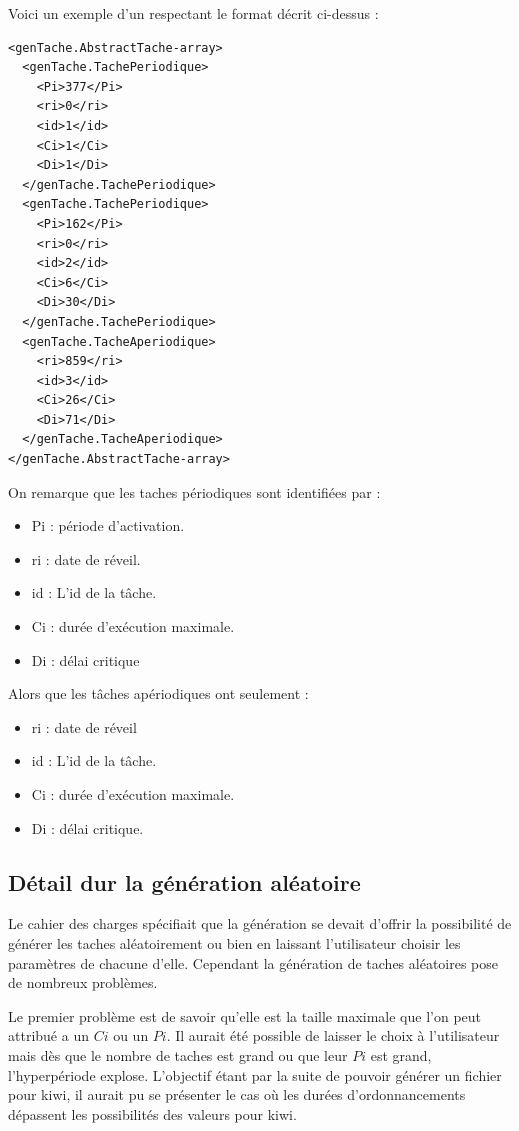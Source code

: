 Voici un exemple d'un respectant le format décrit ci-dessus : 

\begin{lstlisting}
<genTache.AbstractTache-array>
  <genTache.TachePeriodique>
    <Pi>377</Pi>
    <ri>0</ri>
    <id>1</id>
    <Ci>1</Ci>
    <Di>1</Di>
  </genTache.TachePeriodique>
  <genTache.TachePeriodique>
    <Pi>162</Pi>
    <ri>0</ri>
    <id>2</id>
    <Ci>6</Ci>
    <Di>30</Di>
  </genTache.TachePeriodique>
  <genTache.TacheAperiodique>
    <ri>859</ri>
    <id>3</id>
    <Ci>26</Ci>
    <Di>71</Di>
  </genTache.TacheAperiodique>
</genTache.AbstractTache-array>
\end{lstlisting}
On remarque que les taches périodiques sont identifiées par : 
\begin{itemize}
\item
Pi : période d'activation.
\item
ri : date de réveil.
\item
id : L'id de la tâche.
\item
Ci : durée d'exécution maximale.
\item
Di  : délai critique
\end{itemize} 
Alors que les tâches apériodiques ont seulement : 
\begin{itemize}
\item
ri  : date de réveil
\item
id : L'id de la tâche.
\item
Ci : durée d'exécution maximale.
\item
Di : délai critique.
\end{itemize} 
\subsection{Détail dur la génération aléatoire}
Le cahier des charges spécifiait que la génération se devait d'offrir la possibilité de générer les taches aléatoirement ou bien en laissant l'utilisateur choisir les paramètres de chacune d'elle. Cependant la génération de taches aléatoires pose de nombreux problèmes.

Le premier problème est de savoir qu'elle est la taille maximale que l'on peut attribué a un $Ci$ ou un $Pi$. Il aurait été possible de laisser le choix à l'utilisateur mais dès que le nombre de taches est grand ou que leur $Pi$ est grand, l'hyperpériode explose. L'objectif étant par la suite de pouvoir générer un fichier pour kiwi, il aurait pu se présenter le cas où les durées d'ordonnancements dépassent les possibilités des valeurs pour kiwi.

